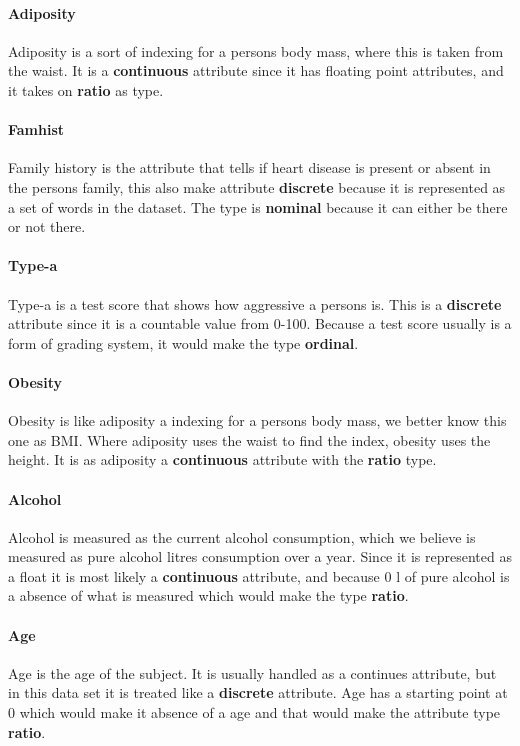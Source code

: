 \paragraph{Adiposity} Adiposity is a sort of indexing for a persons body mass, where this is taken from the waist. It is a \textbf{continuous} attribute since it has floating point attributes, and it takes on \textbf{ratio} as type.

\paragraph{Famhist} Family history is the attribute that tells if heart disease is present or absent in the persons family, this also make attribute \textbf{discrete} because it is represented as a set of words in the dataset. The type is \textbf{nominal} because it can either be there or not there.

\paragraph{Type-a} Type-a is a test score that shows how aggressive a persons is. This is a \textbf{discrete} attribute since it is a countable value from 0-100. Because a test score usually is a form of grading system, it would make the type \textbf{ordinal}.

\paragraph{Obesity} Obesity is like adiposity a indexing for a persons body mass, we better know this one as BMI. Where adiposity uses the waist to find the index, obesity uses the height. It is as adiposity a \textbf{continuous} attribute with the \textbf{ratio} type.

\paragraph{Alcohol} Alcohol is measured as the current alcohol consumption, which we believe is measured as pure alcohol litres consumption over a year. Since it is represented as a float it is most likely a \textbf{continuous} attribute, and because 0 l of pure alcohol is a absence of what is measured which would make the type \textbf{ratio}.

\paragraph{Age} Age is the age of the subject. It is usually handled as a continues attribute, but in this data set it is treated like a \textbf{discrete} attribute. Age has a starting point at 0 which would make it absence of a age and that would make the attribute type \textbf{ratio}.

